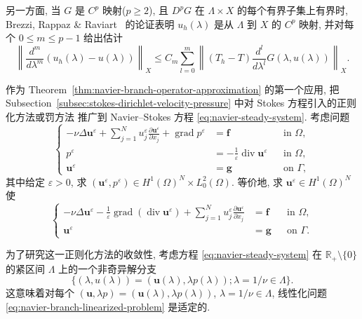 \setcounter{statement}{5}
\begin{Remark}\label{rem:navier-branch-higher-regularity}
另一方面, 当 $G$ 是 $C^p$ 映射($p\geq2$), 且 $D^pG$ 在
$\Lambda\times X$ 的每个有界子集上有界时,
Brezzi, Rappaz \& Raviart~\cite{BrezziRappazRaviart1980} 的论证表明
$u_h(\lambda)$ 是从 $\Lambda$ 到 $X$ 的 $C^p$ 映射, 并对每个
$0\leq m\leq p-1$ 给出估计
\begin{equation}\label{eq:navier-branch-higher-derivative-error}
\left\|\frac{d^m}{d\lambda^m}(u_h(\lambda)-u(\lambda))\right\|_X
\leq C_m\sum_{l=0}^{m}
\left\|(T_h-T)\frac{d^l}{d\lambda^l}G(\lambda,u(\lambda))\right\|_X.
\end{equation}
\end{Remark}

作为 Theorem~\ref{thm:navier-branch-operator-approximation} 的第一个应用,
把 Subsection~\ref{subsec:stokes-dirichlet-velocity-pressure} 中对 Stokes 方程引入的正则化方法或罚方法
推广到 Navier--Stokes 方程 \eqref{eq:navier-steady-system}. 考虑问题
\begin{equation}\label{eq:navier-branch-penalty-system}
\left\{
\begin{aligned}
-\nu\Delta\boldsymbol u^\varepsilon
+\sum_{j=1}^{N}u_j^\varepsilon
\frac{\partial\boldsymbol u^\varepsilon}{\partial x_j}
+\operatorname{grad}p^\varepsilon&=\boldsymbol f
&&\text{in }\Omega,\\
p^\varepsilon&=-\frac1\varepsilon\operatorname{div}\boldsymbol u^\varepsilon
&&\text{in }\Omega,\\
\boldsymbol u^\varepsilon&=\boldsymbol g
&&\text{on }\Gamma,
\end{aligned}
\right.
\end{equation}
其中给定 $\varepsilon>0$, 求
$(\boldsymbol u^\varepsilon,p^\varepsilon)\in H^1(\Omega)^N\times L_0^2(\Omega)$.
等价地, 求 $\boldsymbol u^\varepsilon\in H^1(\Omega)^N$ 使
\begin{equation}\label{eq:navier-branch-penalty-velocity}
\left\{
\begin{aligned}
-\nu\Delta\boldsymbol u^\varepsilon
-\frac1\varepsilon\operatorname{grad}(\operatorname{div}\boldsymbol u^\varepsilon)
+\sum_{j=1}^{N}u_j^\varepsilon
\frac{\partial\boldsymbol u^\varepsilon}{\partial x_j}
&=\boldsymbol f &&\text{in }\Omega,\\
\boldsymbol u^\varepsilon&=\boldsymbol g &&\text{on }\Gamma.
\end{aligned}
\right.
\end{equation}

为了研究这一正则化方法的收敛性, 考虑方程
\eqref{eq:navier-steady-system}
在 $\mathbb R_+\setminus\{0\}$ 的紧区间 $\Lambda$ 上的一个非奇异解分支
\[
\{(\lambda,u(\lambda))=(\boldsymbol u(\lambda),\lambda p(\lambda));
\lambda=1/\nu\in\Lambda\}.
\]
这意味着对每个
$(\boldsymbol u,\lambda p)=(\boldsymbol u(\lambda),\lambda p(\lambda))$,
$\lambda=1/\nu\in\Lambda$, 线性化问题 \eqref{eq:navier-branch-linearized-problem}
是适定的.


